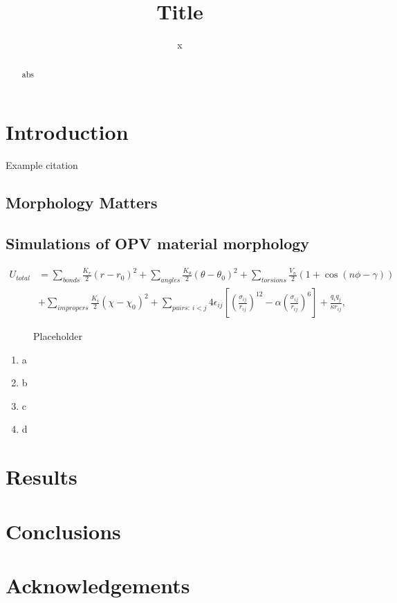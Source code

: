 \documentclass[journal = jacs, manuscript = article, layout=onecolumn]{achemso}
\author{x}
\affiliation{x}
\title{Title}
\begin{document}
\begin{abstract}
abs
\end{abstract}


\section{Introduction}
Example citation\cite{Jankowski2009}

\subsection{Morphology Matters}

\subsection{Simulations of OPV material morphology}
\begin{align}
U_{total}&= \sum_{bonds} \frac{K_r}{2}(r-r_0)^2 + \sum_{angles} \frac{K_\theta}{2}(\theta-\theta_0)^2 + \sum_{torsions} \frac{V_n}{2}(1+\cos(n\phi-\gamma)) \nonumber \\
&+ \sum_{impropers} \frac{K_i}{2}(\chi-\chi_0)^2 + \sum_{pairs:~i<j} 4\epsilon_{ij}\left[ \left(\frac{\sigma_{ij}}{r_{ij}}\right)^{12}- \alpha\left(\frac{\sigma_{ij}}{r_{ij}}\right)^{6}\right] + \frac{q_iq_j}{\kappa r_{ij}},
\end{align}

\begin{figure}[tb]
\centering
\caption{\label{fig:zero} Placeholder}
\end{figure}

\begin{enumerate}
\item a
\item b
\item c
\item d
\end{enumerate}

\section{Results}

\section{Conclusions}

\section{Acknowledgements}


\end{document}
